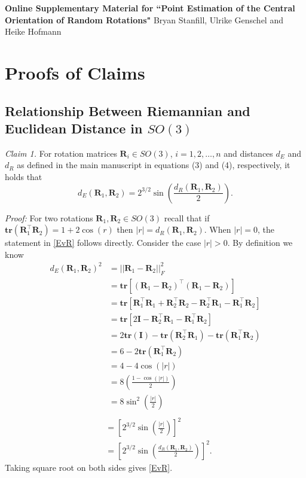 \documentclass[12pt]{article}
\newcommand{\tr}{{\mathbf{tr}}}
\newcommand{\Rdist}{{d_R}}
\newcommand{\Edist}{{d_E}}
\begin{document}
\def\spacingset#1{\renewcommand{\baselinestretch}%
{#1}\small\normalsize} \spacingset{1}
\appendix
\spacingset{1.45} %
\begin{center}
\Large \textbf{Online Supplementary Material for ``Point Estimation of the Central Orientation of Random Rotations"}
\large{Bryan Stanfill, Ulrike Genschel and Heike Hofmann}
\end{center}
\section{Proofs of Claims}
\subsection{Relationship Between Riemannian and Euclidean Distance in $SO(3)$}
\label{sec:appendix2}
\textit{Claim 1.} For rotation matrices $\bm R_i\in SO(3)$, $i=1,2,\ldots,n$ and distances $d_E$ and $d_R$ as defined in the main manuscript in equations (3) and (4), respectively,  it holds that 
\begin{equation}
\label{EvR}
\Edist(\bm R_1,\bm R_2)=2^{3/2}\sin\left(\frac{\Rdist(\bm{R}_1,\bm{R}_2)}{2}\right).
\end{equation}

\noindent \textit{Proof:} For two rotations $\bm{R}_1,\bm{R}_2\in SO(3)$ recall that if $\tr(\bm R_1^\top\bm R_2)=1+2\cos(r)$ then $|r|=\Rdist(\bm R_1,\bm R_2)$.  When $|r|=0$, the statement in \eqref{EvR} follows directly.  Consider the case $|r|>0$.  By definition we know
\begin{align*}
\Edist (\bm R_1,\bm R_2)^2
&=||\bm R_1-\bm R_2||_F^2\\
&=\tr\left[(\bm R_1-\bm R_2)^\top(\bm R_1-\bm R_2)\right]\\
&=\tr\left[\bm R_1^\top\bm R_1+\bm R_2^\top\bm R_2-\bm R_2^\top\bm R_1-\bm R_1^\top\bm R_2\right]\\
&=\tr\left[2\bm{I}-\bm R_2^\top\bm R_1-\bm R_1^\top\bm R_2\right]\\
&=2\tr(\bm{I})-\tr(\bm R_2^\top\bm R_1)-\tr(\bm R_1^\top\bm R_2)\\
&=6-2\tr(\bm R_1^\top\bm R_2)\\
&=4-4\cos(|r|)\\ 
&=8\left(\frac{1-\cos(|r|)}{2}\right)\\
&=8\sin^2\left(\frac{|r|}{2}\right)\\
\end{align*}
\begin{align*}
&=\left[2^{3/2}\sin\left(\frac{|r|}{2}\right)\right]^2\\
&=\left[2^{3/2}\sin\left(\frac{\Rdist(\bm R_1,\bm R_2)}{2}\right)\right]^2.
\end{align*}
Taking square root on both sides gives \eqref{EvR}.
\end{document}
